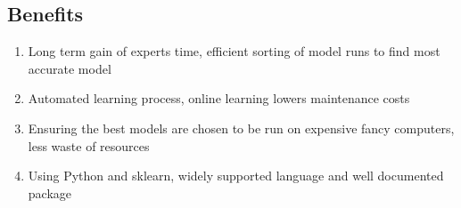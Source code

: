 \documentclass[11pt]{article} %
\numberwithin{equation}{section}
\begin{document}
\subsection{Benefits}
\begin{enumerate}
\item Long term gain of experts time, efficient sorting of model runs to find most accurate model
\item Automated learning process, online learning lowers maintenance costs
\item Ensuring the best models are chosen to be run on expensive fancy computers, less waste of resources
\item Using Python and sklearn, widely supported language and well documented package
\end{enumerate}
\end{document}
